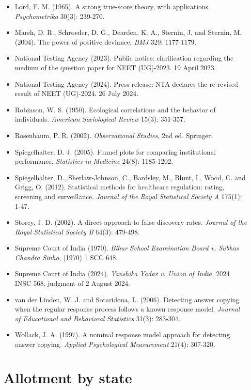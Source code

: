 \documentclass[11pt]{article}
\begin{document}
\begin{small}
\begin{itemize}[leftmargin=1em,label={}]
\item Lord, F. M. (1965). A strong true-score theory, with applications. \textit{Psychometrika} 30(3): 239-270.
\item Marsh, D. R., Schroeder, D. G., Dearden, K. A., Sternin, J. and Sternin, M. (2004). The power of positive deviance. \textit{BMJ} 329: 1177-1179.
\item National Testing Agency (2023). Public notice: clarification regarding the medium of the question paper for NEET (UG)-2023. 19 April 2023.
\item National Testing Agency (2024). Press release: NTA declares the re-revised result of NEET (UG)-2024. 26 July 2024.
\item Robinson, W. S. (1950). Ecological correlations and the behavior of individuals. \textit{American Sociological Review} 15(3): 351-357.
\item Rosenbaum, P. R. (2002). \textit{Observational Studies}, 2nd ed. Springer.
\item Spiegelhalter, D. J. (2005). Funnel plots for comparing institutional performance. \textit{Statistics in Medicine} 24(8): 1185-1202.
\item Spiegelhalter, D., Sherlaw-Johnson, C., Bardsley, M., Blunt, I., Wood, C. and Grigg, O. (2012). Statistical methods for healthcare regulation: rating, screening and surveillance. \textit{Journal of the Royal Statistical Society A} 175(1): 1-47.
\item Storey, J. D. (2002). A direct approach to false discovery rates. \textit{Journal of the Royal Statistical Society B} 64(3): 479-498.
\item Supreme Court of India (1970). \textit{Bihar School Examination Board v. Subhas Chandra Sinha}, (1970) 1 SCC 648.
\item Supreme Court of India (2024). \textit{Vanshika Yadav v. Union of India}, 2024 INSC 568, judgment of 2 August 2024.
\item van der Linden, W. J. and Sotaridona, L. (2006). Detecting answer copying when the regular response process follows a known response model. \textit{Journal of Educational and Behavioral Statistics} 31(3): 283-304.
\item Wollack, J. A. (1997). A nominal response model approach for detecting answer copying. \textit{Applied Psychological Measurement} 21(4): 307-320.
\end{itemize}
\end{small}

\appendix
\section{Allotment by state}
\begin{table}[H]\centering
\caption{States with ten or more testable centres. ICC of marks among centres within cities; standard deviation of centre-mean z-scores (1 under random allotment); share of centres beyond $\pm3$; share of registrants choosing a regional-language paper.}

\end{table}
\end{document}
